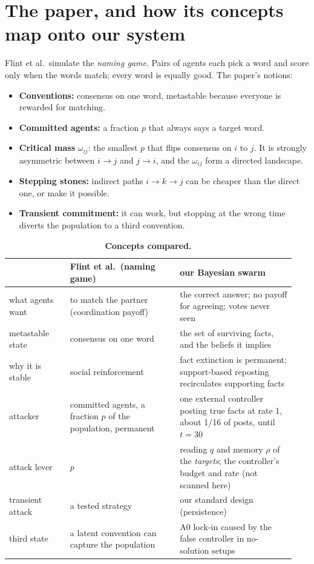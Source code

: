 \documentclass[10pt,a4paper]{article}
\begin{document}
\section{The paper, and how its concepts map onto our system}
Flint et al.\ simulate the \emph{naming game}. Pairs of agents each pick a word and score only when the words match;
every word is equally good. The paper's notions:
\begin{itemize}
\item \textbf{Conventions:} consensus on one word, metastable because everyone is rewarded for matching.
\item \textbf{Committed agents:} a fraction $p$ that always says a target word.
\item \textbf{Critical mass} $\omega_{ij}$: the smallest $p$ that flips consensus on $i$ to $j$. It is strongly
  asymmetric between $i\to j$ and $j\to i$, and the $\omega_{ij}$ form a directed landscape.
\item \textbf{Stepping stones:} indirect paths $i\to k\to j$ can be cheaper than the direct one, or make it possible.
\item \textbf{Transient commitment:} it can work, but stopping at the wrong time diverts the population to a third
  convention.
\end{itemize}

\begin{table}[H]
\centering\small
\caption{\textbf{Concepts compared.}}
\label{tab:map}
\begin{tabular}{@{}p{0.2\linewidth}p{0.36\linewidth}p{0.38\linewidth}@{}}\toprule
 & Flint et al.\ (naming game) & our Bayesian swarm\\\midrule
what agents want & to match the partner (coordination payoff) & the correct answer; no payoff for agreeing; votes
never seen\\
metastable state & consensus on one word & the set of surviving facts, and the beliefs it implies\\
why it is stable & social reinforcement & fact extinction is permanent; support-based reposting recirculates
supporting facts\\
attacker & committed agents, a fraction $p$ of the population, permanent & one external controller posting true
facts at rate 1, about 1/16 of posts, until $t=30$\\
attack lever & $p$ & reading $q$ and memory $\rho$ of the \emph{targets}; the controller's budget and rate (not
scanned here)\\
transient attack & a tested strategy & our standard design (persistence)\\
third state & a latent convention can capture the population & A0 lock-in caused by the false controller in
no-solution setups\\\bottomrule
\end{tabular}
\end{table}
\end{document}
